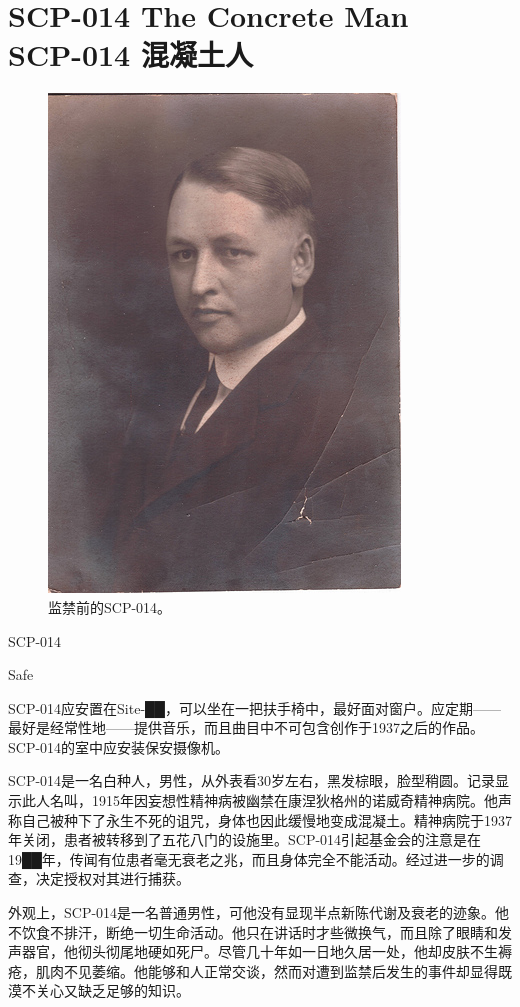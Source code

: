 \chapter[SCP-014 混凝土人]{
    SCP-014 The Concrete Man\\
    SCP-014 混凝土人
}

\label{chap:SCP-014}

\begin{figure}[H]
    \centering
    \includegraphics[width=0.5\linewidth]{images/SCP.014.jpg}
    \caption*{监禁前的SCP-014。}
\end{figure}

SCP-014

Safe

SCP-014应安置在Site-██，可以坐在一把扶手椅中，最好面对窗户。应定期——最好是经常性地——提供音乐，而且曲目中不可包含创作于1937之后的作品。SCP-014的室中应安装保安摄像机。

SCP-014是一名白种人，男性，从外表看30岁左右，黑发棕眼，脸型稍圆。记录显示此人名叫，1915年因妄想性精神病被幽禁在康涅狄格州的诺威奇精神病院。他声称自己被种下了永生不死的诅咒，身体也因此缓慢地变成混凝土。精神病院于1937年关闭，患者被转移到了五花八门的设施里。SCP-014引起基金会的注意是在19██年，传闻有位患者毫无衰老之兆，而且身体完全不能活动。经过进一步的调查，决定授权对其进行捕获。

外观上，SCP-014是一名普通男性，可他没有显现半点新陈代谢及衰老的迹象。他不饮食不排汗，断绝一切生命活动。他只在讲话时才些微换气，而且除了眼睛和发声器官，他彻头彻尾地硬如死尸。尽管几十年如一日地久居一处，他却皮肤不生褥疮，肌肉不见萎缩。他能够和人正常交谈，然而对遭到监禁后发生的事件却显得既漠不关心又缺乏足够的知识。

\\
